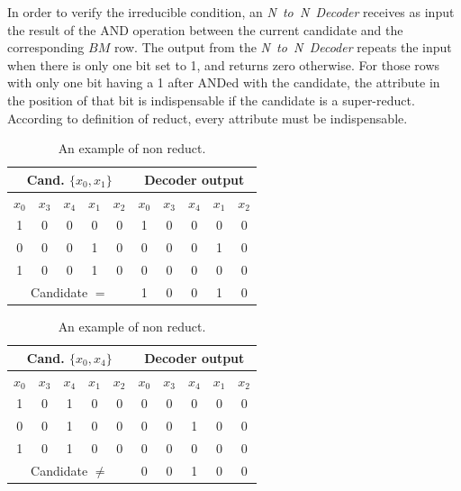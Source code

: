 \documentclass[authoryear,preprint,review,12pt]{elsarticle}
\begin{document}
In order to verify the irreducible condition, an \textit{N~to~N~Decoder}
receives as input the result of the AND operation between the current candidate and the corresponding $BM$ row.
The output from the \textit{N~to~N~Decoder} repeats the input when there is only one bit set
to 1, and returns zero otherwise. For those rows with only one bit having a 1 after ANDed with the candidate,
the attribute in the position of that bit is indispensable if the candidate is a super-reduct.
According to definition of reduct, every attribute must be indispensable. %

\setlength{\tabcolsep}{3pt}
\begin{table}[!htb]
    \begin{minipage}{.5\linewidth}
      \caption{An example of reduct.}\label{table4}
      \centering
        \begin{tabular}{ ccccc|ccccc }
 			\hline                       
  			\multicolumn{5}{c|}{Cand. $\{x_0, x_1\}$} & 
  			\multicolumn{5}{c}{Decoder output} \\
  			\hline
			  $x_0$ &   $x_3$ &   $x_4$ &   $x_1$ &   $x_2$ &
  			  $x_0$ &   $x_3$ &   $x_4$ &   $x_1$ &   $x_2$ \\
  			\hline
  			1 & 0 & 0 & 0 & 0 & 1 & 0 & 0 & 0 & 0\\
  			0 & 0 & 0 & 1 & 0 & 0 & 0 & 0 & 1 & 0\\
  			1 & 0 & 0 & 1 & 0 & 0 & 0 & 0 & 0 & 0\\
  			\hline  
  			\multicolumn{5}{c|}{Candidate $=$} & 1 & 0 & 0 & 1 & 0\\
  			\hline  
		\end{tabular}
    \end{minipage}%
    \begin{minipage}{.5\linewidth}
      \centering
        \caption{An example of non reduct.}\label{table5}
        \begin{tabular}{ ccccc|ccccc }
 			\hline                       
  			\multicolumn{5}{c|}{Cand. $\{x_0, x_4\}$} & 
  			\multicolumn{5}{c}{Decoder output} \\
  			\hline
  			  $x_0$ &   $x_3$ &   $x_4$ &   $x_1$ &   $x_2$ &
  			  $x_0$ &   $x_3$ &   $x_4$ &   $x_1$ &   $x_2$ \\
  			\hline
  			1 & 0 & 1 & 0 & 0 & 0 & 0 & 0 & 0 & 0\\
  			0 & 0 & 1 & 0 & 0 & 0 & 0 & 1 & 0 & 0\\
  			1 & 0 & 1 & 0 & 0 & 0 & 0 & 0 & 0 & 0\\
  			\hline  
  			\multicolumn{5}{c|}{Candidate $\neq$} & 0 & 0 & 1 & 0 & 0\\
  			\hline  
		\end{tabular}
    \end{minipage} 
\end{table}
\end{document}
